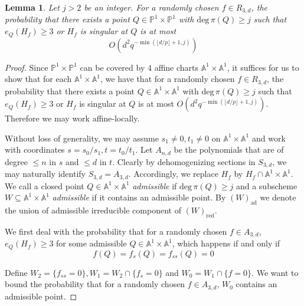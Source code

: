\documentclass[12pt]{article}
\theoremstyle{plain}
\newtheorem{lemma}[equation]{Lemma}
\theoremstyle{definition}
\newcommand{\IA}{\mathbb{A}}
\newcommand{\IP}{\mathbb{P}}
\renewcommand{\deg}{\mathrm{deg}\,}
\newcommand{\<}{\langle}
\renewcommand{\>}{\rangle}
\begin{document}
\begin{lemma}
\label{prep}
Let $j > 2$ be an integer. For a randomly chosen $f \in R_{3, d}$, the probability that there exists a point $Q \in \IP^1 \times \IP^1$ with $\deg \pi(Q) \ge j$ such that $e_{Q}(H_f) \ge 3$ or $H_f$ is singular at $Q$ is at most 
$$ O(d^2 q^{- \min(\lfloor d/p \rfloor + 1, j)}) $$
\end{lemma}
\begin{proof}
Since $\IP^1 \times \IP^1$ can be covered by $4$ affine charts $\IA^1 \times \IA^1$, it suffices for us to show that for each $\IA^1 \times \IA^1$, we have that for a randomly chosen $f \in R_{3, d}$, the probability that there exists a point $Q \in \IA^1 \times \IA^1$ with $\deg \pi(Q) \ge j$ such that $e_{Q}(H_f) \ge 3$ or $H_f$ is singular at $Q$ is at most $O(d^2 q^{- \min(\lfloor d/p \rfloor + 1, j)})$. Therefore we may work affine-locally. 

Without loss of generality, we may assume $s_1 \neq 0, t_1 \neq 0$ on $\IA^1 \times \IA^1$ and work with coordinates $s = s_0/s_1, t = t_0/t_1$. Let $A_{n, d}$ be the polynomials that are of degree $\le n$ in $s$ and $\le d$ in $t$. Clearly by dehomogenizing sections in $S_{3, d}$, we may naturally identify $S_{3, d} = A_{3, d}$. Accordingly, we replace $H_f$ by $H_f \cap \IA^1 \times \IA^1$. We call a closed point $Q \in \IA^1 \times \IA^1$ \textit{admissible} if $\deg \pi(Q) \ge j$ and a subscheme $W \subseteq \IA^1 \times \IA^1$ \textit{admissible} if it contains an admissible point. By $(W)_{\mathrm{ad}}$ we denote the union of admissible irreducible component of $(W)_{\mathrm{red}}$. 

We first deal with the probability that for a randomly chosen $f \in A_{3, d}$, $e_Q(H_f) \ge 3$ for some admissible $Q \in \IA^1 \times \IA^1$, which happens if and only if \begin{equation} \label{ramify} f(Q) = f_s(Q) = f_{ss}(Q) = 0 \end{equation}  

Define $W_2 = \{f_{ss} = 0 \}, W_1 = W_2 \cap \{ f_s = 0 \}$ and $W_0 = W_1 \cap \{ f = 0 \}$. We want to bound the probability that for a randomly chosen $f \in A_{3, d}$, $W_0$ contains an admissible point.  


\end{proof}
\end{document}

